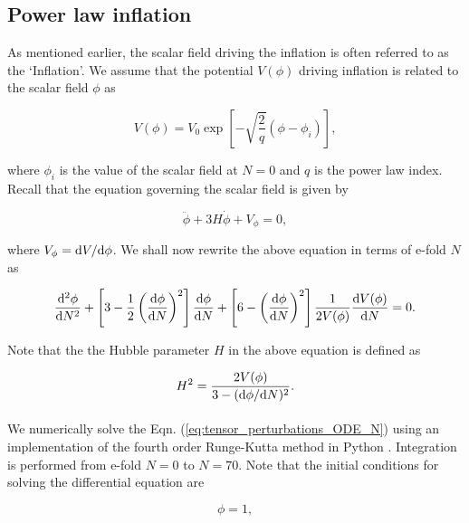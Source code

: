 \documentclass[12pt,a4paper,oneside]{book}
\begin{document}
\subsection{Power law inflation}

As mentioned earlier, the scalar field driving the inflation is often referred to as the `Inflation'. 
We assume that the potential $V(\phi)$ driving inflation is related to the scalar field $\phi$ as 

\begin{equation}\label{eq:vofphi}
V(\phi) = V_0 \exp\left[-\sqrt{\frac{2}{q}}\left(\phi - \phi_i\right)\right],
\end{equation}

\noindent where $\phi_i$ is the value of the scalar field at $N=0$ and $q$ is the power law index. 
Recall that the equation governing the scalar field is given by 

\begin{equation}\label{eq:phi_ODE}
\ddot{\phi} + 3H\dot{\phi} + V_{\phi} = 0,
\end{equation}

\noindent where $V_{\phi} = {\rm d}V/{\rm d}\phi$. 
We shall now rewrite the above equation in terms of e-fold $N$ as

\begin{equation}\label{eq:phi_ODE_N}
\frac{{\rm d}^2\phi}{{\rm d}N^2} + \left[3 - \frac{1}{2}\left(\frac{{\rm d}\phi}
{{\rm d}N}\right)^2\right]\frac{{\rm d}\phi}{{\rm d}N} + \left[6 
- \left(\frac{{\rm d}\phi}{{\rm d}N}\right)^2\right]\frac{1}{2V(\phi)}
\frac{{\rm d}V(\phi)}{{\rm d}N} = 0.
\end{equation}

\noindent Note that the the Hubble parameter $H$ in the above equation is defined as

\begin{equation}
H^2 = \frac{2V(\phi)}{3-({\rm d}\phi/{\rm d}N)^2}.
\end{equation}

\paragraph*{} We numerically solve the Eqn. (\ref{eq:tensor_perturbations_ODE_N}) using an implementation 
of the fourth order Runge-Kutta method in Python \cite{python, numpy, matplotlib}. Integration is performed from 
e-fold $N = 0$  to $N = 70$. Note that the initial conditions for solving the differential equation are 

\begin{equation}
\phi = 1,
\end{equation}
\end{document}

